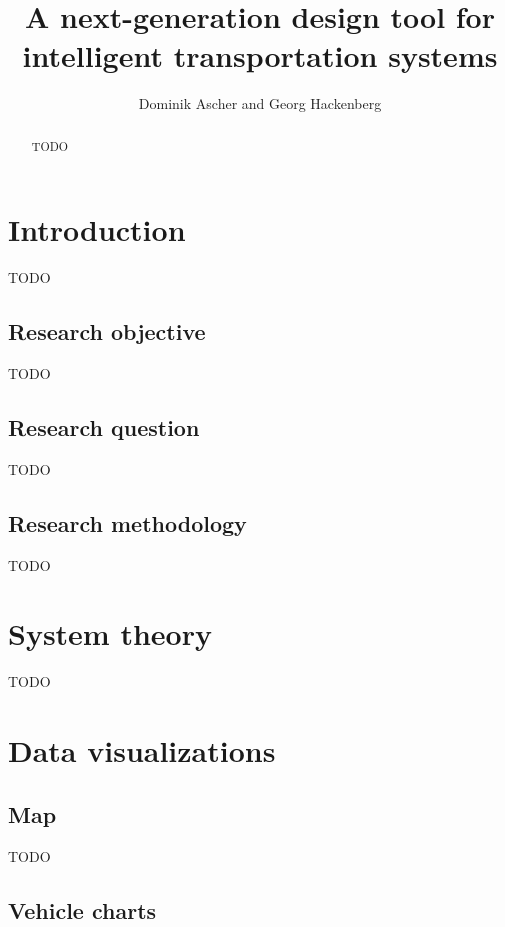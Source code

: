 \documentclass[11pt,twocolumn]{article}
\begin{document}
\title{A next-generation design tool for intelligent transportation systems}
\author{Dominik Ascher and Georg Hackenberg}
\maketitle

\begin{abstract}
    TODO
\end{abstract}

\section{Introduction}
\label{sec:introduction}

TODO~\cite{Ascher2014,Ascher2015,Ascher2016}

\subsection{Research objective}

TODO

\subsection{Research question}

TODO

\subsection{Research methodology}

TODO

\section{System theory}
\label{sec:retrospection}

TODO

\section{Data visualizations}
\label{sec:visualization}

\subsection{Map}

TODO

\subsection{Vehicle charts}
\end{document}
